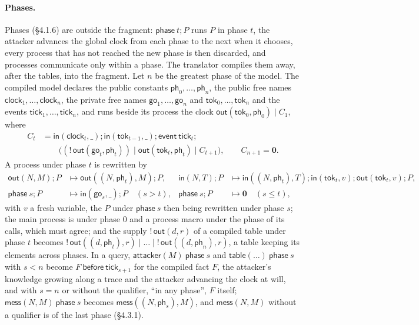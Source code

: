 \documentclass[11pt]{article}
\theoremstyle{definition}
\theoremstyle{plain}
\theoremstyle{remark}
\begin{document}
\paragraph{Phases.} Phases (\S4.1.6) are outside the fragment: $\mathsf{phase}\ t;P$ runs $P$ in phase $t$, the attacker advances the global clock from each phase to the next when it chooses, every process that has not reached the new phase is then discarded, and processes communicate only within a phase. The translator compiles them away, after the tables, into the fragment. Let $n$ be the greatest phase of the model. The compiled model declares the public constants $\mathsf{ph}_0,\dots,\mathsf{ph}_n$, the public free names $\mathsf{clock}_1,\dots,\mathsf{clock}_n$, the private free names $\mathsf{go}_1,\dots,\mathsf{go}_n$ and $\mathsf{tok}_0,\dots,\mathsf{tok}_n$ and the events $\mathsf{tick}_1,\dots,\mathsf{tick}_n$, and runs beside its process the clock $\mathsf{out}(\mathsf{tok}_0,\mathsf{ph}_0)\mid C_1$, where
\begin{align*}
C_t&=\mathsf{in}(\mathsf{clock}_t,\_);\mathsf{in}(\mathsf{tok}_{t-1},\_);\mathsf{event}\ \mathsf{tick}_t;\\
&\qquad\big((!\,\mathsf{out}(\mathsf{go}_t,\mathsf{ph}_t))\mid\mathsf{out}(\mathsf{tok}_t,\mathsf{ph}_t)\mid C_{t+1}\big),\qquad C_{n+1}=\mathbf{0}.
\end{align*}
A process under phase $t$ is rewritten by
\begin{align*}
\mathsf{out}(N,M);P&\mapsto\mathsf{out}((N,\mathsf{ph}_t),M);P, &
\mathsf{in}(N,T);P&\mapsto\mathsf{in}((N,\mathsf{ph}_t),T);\mathsf{in}(\mathsf{tok}_t,v);\mathsf{out}(\mathsf{tok}_t,v);P,\\
\mathsf{phase}\ s;P&\mapsto\mathsf{in}(\mathsf{go}_s,\_);P\quad(s>t), &
\mathsf{phase}\ s;P&\mapsto\mathbf{0}\quad(s\le t),
\end{align*}
with $v$ a fresh variable, the $P$ under $\mathsf{phase}\ s$ then being rewritten under phase $s$; the main process is under phase $0$ and a process macro under the phase of its calls, which must agree; and the supply $!\,\mathsf{out}(d,r)$ of a compiled table under phase $t$ becomes $!\,\mathsf{out}((d,\mathsf{ph}_t),r)\mid\dots\mid!\,\mathsf{out}((d,\mathsf{ph}_n),r)$, a table keeping its elements across phases. In a query, $\mathsf{attacker}(M)\ \mathsf{phase}\ s$ and $\mathsf{table}(\dots)\ \mathsf{phase}\ s$ with $s<n$ become $F\ \mathsf{before}\ \mathsf{tick}_{s+1}$ for the compiled fact $F$, the attacker's knowledge growing along a trace and the attacker advancing the clock at will, and with $s=n$ or without the qualifier, ``in any phase'', $F$ itself; $\mathsf{mess}(N,M)\ \mathsf{phase}\ s$ becomes $\mathsf{mess}((N,\mathsf{ph}_s),M)$, and $\mathsf{mess}(N,M)$ without a qualifier is of the last phase (\S4.3.1).
\end{document}
